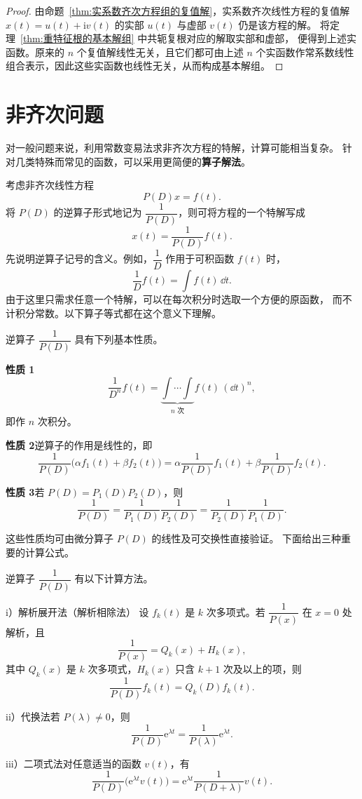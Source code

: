 \begin{proof}
	由命题~\ref{thm:实系数齐次方程组的复值解}，实系数齐次线性方程的复值解
	$x(t)=u(t)+\mathrm{i} v(t)$ 的实部 $u(t)$ 与虚部 $v(t)$ 仍是该方程的解。
	将定理~\ref{thm:重特征根的基本解组} 中共轭复根对应的解取实部和虚部，
	便得到上述实函数。原来的 $n$ 个复值解线性无关，且它们都可由上述
	$n$ 个实函数作常系数线性组合表示，因此这些实函数也线性无关，从而构成基本解组。
\end{proof}

\section{非齐次问题}\label{sec:常系数线性方程的非齐次问题}

对一般问题来说，利用常数变易法求非齐次方程的特解，计算可能相当复杂。
针对几类特殊而常见的函数，可以采用更简便的\textbf{算子解法}。

考虑非齐次线性方程
\[
	P(D)x=f(t).
\]
将 $P(D)$ 的逆算子形式地记为 $\dfrac{1}{P(D)}$，则可将方程的一个特解写成
\[
	x(t)=\dfrac{1}{P(D)}f(t).
\]
先说明逆算子记号的含义。例如，$\dfrac{1}{D}$ 作用于可积函数 $f(t)$ 时，
\[
	\dfrac{1}{D}f(t)=\int f(t)\,\dd t.
\]
由于这里只需求任意一个特解，可以在每次积分时选取一个方便的原函数，
而不计积分常数。以下算子等式都在这个意义下理解。

逆算子 $\dfrac{1}{P(D)}$ 具有下列基本性质。

\noindent\textbf{性质 1}\quad
\[
	\dfrac{1}{D^n}f(t)
	=\underbrace{\int\cdots\int}_{n\text{ 次}}f(t)\,(\dd t)^n,
\]
即作 $n$ 次积分。

\noindent\textbf{性质 2}\quad 逆算子的作用是线性的，即
\[
	\dfrac{1}{P(D)}\bigl(\alpha f_1(t)+\beta f_2(t)\bigr)
	=\alpha\dfrac{1}{P(D)}f_1(t)
	+\beta\dfrac{1}{P(D)}f_2(t).
\]

\noindent\textbf{性质 3}\quad 若 $P(D)=P_1(D)P_2(D)$，则
\[
	\dfrac{1}{P(D)}
	=\dfrac{1}{P_1(D)}\dfrac{1}{P_2(D)}
	=\dfrac{1}{P_2(D)}\dfrac{1}{P_1(D)}.
\]

这些性质均可由微分算子 $P(D)$ 的线性及可交换性直接验证。
下面给出三种重要的计算公式。

\begin{proposition}\label{thm:逆算子的三种计算方法}
	逆算子 $\dfrac{1}{P(D)}$ 有以下计算方法。

	\textup{i）解析展开法（解析相除法）}\quad
	设 $f_k(t)$ 是 $k$ 次多项式。若 $\dfrac{1}{P(x)}$ 在 $x=0$ 处解析，且
	\[
		\dfrac{1}{P(x)}=Q_k(x)+H_k(x),
	\]
	其中 $Q_k(x)$ 是 $k$ 次多项式，$H_k(x)$ 只含 $k+1$ 次及以上的项，则
	\[
		\dfrac{1}{P(D)}f_k(t)=Q_k(D)f_k(t).
	\]

	\textup{ii）代换法}\quad 若 $P(\lambda)\neq0$，则
	\[
		\dfrac{1}{P(D)}\mathrm{e}^{\lambda t}
		=\dfrac{1}{P(\lambda)}\mathrm{e}^{\lambda t}.
	\]

	\textup{iii）二项式法}\quad 对任意适当的函数 $v(t)$，有
	\[
		\dfrac{1}{P(D)}\bigl(\mathrm{e}^{\lambda t}v(t)\bigr)
		=\mathrm{e}^{\lambda t}\dfrac{1}{P(D+\lambda)}v(t).
	\]
\end{proposition}

